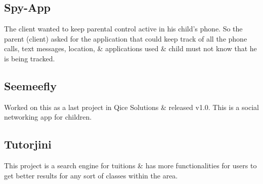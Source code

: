 \documentclass[]{deedy-resume-openfont}
\begin{document}
\begin{minipage}[t]{0.99\textwidth}
\subsection{Spy-App}
The client wanted to keep parental control active in his child’s phone. So the parent (client) asked for the application that could keep track of all the phone calls, text messages, location, \& applications used \& child must not know that he is being tracked.
\sectionsep


\subsection{Seemeefly}
Worked on this as a last project in Qice Solutions \& released v1.0. This is a social networking app for children.
\sectionsep


\subsection{Tutorjini}
This project is a search engine for tuitions \& has more functionalities for users to get better results for any sort of classes within the area.
\sectionsep
\end{minipage} 
\end{document}
